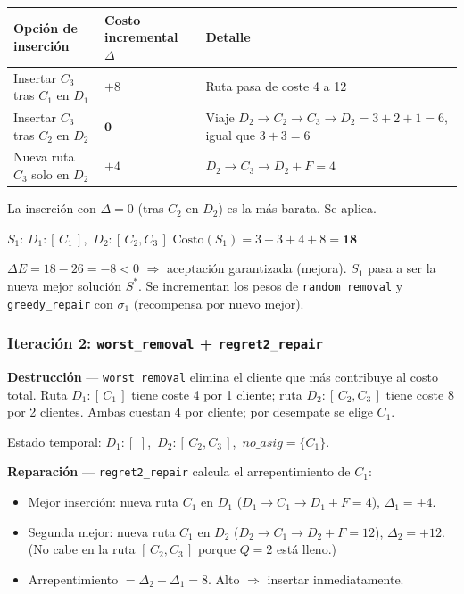 \documentclass[12pt,a4paper]{article}
\begin{document}
\begin{center}
\begin{tabular}{lll}
\toprule
Opción de inserción & Costo incremental $\Delta$ & Detalle \\
\midrule
Insertar $C_3$ tras $C_1$ en $D_1$ & $+8$ & Ruta pasa de coste 4 a 12 \\
Insertar $C_3$ tras $C_2$ en $D_2$ & $\mathbf{0}$ & Viaje $D_2\!\to\!C_2\!\to\!C_3\!\to\!D_2 = 3+2+1 = 6$, igual que $3+3=6$ \\
Nueva ruta $C_3$ solo en $D_2$      & $+4$ & $D_2\!\to\!C_3\!\to\!D_2+F=4$ \\
\bottomrule
\end{tabular}
\end{center}

La inserción con $\Delta=0$ (tras $C_2$ en $D_2$) es la más barata. Se aplica.

$S_1$: $D_1:[\,C_1\,]$,\ $D_2:[\,C_2, C_3\,]$
$\text{Costo}(S_1) = 3+3+4+8 = \mathbf{18}$

$\Delta E = 18 - 26 = -8 < 0$ $\Rightarrow$ aceptación garantizada (mejora).
$S_1$ pasa a ser la nueva mejor solución $S^*$. Se incrementan los pesos de \texttt{random\_removal} y \texttt{greedy\_repair} con $\sigma_1$ (recompensa por nuevo mejor).

\subsubsection*{Iteración 2: \texttt{worst\_removal} + \texttt{regret2\_repair}}

\textbf{Destrucción} — \texttt{worst\_removal} elimina el cliente que más contribuye al costo total.
Ruta $D_1:[\,C_1\,]$ tiene coste 4 por 1 cliente; ruta $D_2:[\,C_2,C_3\,]$ tiene coste 8 por 2 clientes.
Ambas cuestan 4 por cliente; por desempate se elige $C_1$.

Estado temporal: $D_1:[\,\,]$,\ $D_2:[\,C_2,C_3\,]$,\ $\textit{no\_asig}=\{C_1\}$.

\textbf{Reparación} — \texttt{regret2\_repair} calcula el arrepentimiento de $C_1$:
\begin{itemize}[noitemsep]
  \item Mejor inserción: nueva ruta $C_1$ en $D_1$ ($D_1\!\to\!C_1\!\to\!D_1+F=4$), $\Delta_1=+4$.
  \item Segunda mejor: nueva ruta $C_1$ en $D_2$ ($D_2\!\to\!C_1\!\to\!D_2+F=12$), $\Delta_2=+12$.
    (No cabe en la ruta $[\,C_2,C_3\,]$ porque $Q=2$ está lleno.)
  \item Arrepentimiento $= \Delta_2 - \Delta_1 = 8$. Alto $\Rightarrow$ insertar inmediatamente.
\end{itemize}
\end{document}
